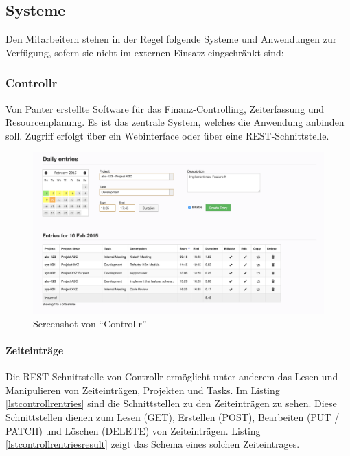 \documentclass[]{article}
\begin{document}
\pagebreak

\subsection{\texorpdfstring{Systeme\label{secSysteme}}{Systeme}}\label{systeme}

Den Mitarbeitern stehen in der Regel folgende Systeme und Anwendungen
zur Verfügung, sofern sie nicht im externen Einsatz eingschränkt sind:

\subsubsection{\texorpdfstring{Controllr\label{secControllr}}{Controllr}}\label{controllr}

Von Panter erstellte Software für das Finanz-Controlling, Zeiterfassung
und Resourcenplanung. Es ist das zentrale System, welches die Anwendung
anbinden soll. Zugriff erfolgt über ein Webinterface oder über eine
REST-Schnittstelle.

\begin{figure}[htbp]
\centering
\includegraphics{../img/controllr.png}
\caption{Screenshot von ``Controllr''\label{figControllr}}
\end{figure}

\paragraph{Zeiteinträge}\label{zeiteintruxe4ge}

Die REST-Schnittstelle von Controllr ermöglicht unter anderem das Lesen
und Manipulieren von Zeiteinträgen, Projekten und Tasks. Im Listing
\ref{lstcontrollrentries} sind die Schnittstellen zu den Zeiteinträgen
zu sehen. Diese Schnittstellen dienen zum Lesen (GET), Erstellen (POST),
Bearbeiten (PUT / PATCH) und Löschen (DELETE) von Zeiteinträgen. Listing
\ref{lstcontrollrentriesresult} zeigt das Schema eines solchen
Zeiteintrages.
\end{document}
